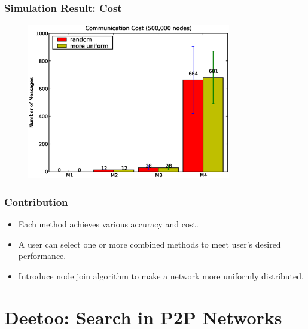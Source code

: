 \documentclass[red]{beamer}
\begin{document}
\begin{frame}
\frametitle{Simulation Result: Cost}
\begin{figure}
\centering
\includegraphics[width=3.5in]{figs/cost500k}
\end{figure}
\end{frame}

\begin{frame}
\frametitle{Contribution}
\begin{itemize}
\item Each method achieves various accuracy and cost.
\item A user can select one or more combined methods to meet user's desired performance.
\item Introduce node join algorithm to make a network more uniformly distributed.
\end{itemize}
\end{frame}


\section{Deetoo: Search in P2P Networks}
\end{document}
